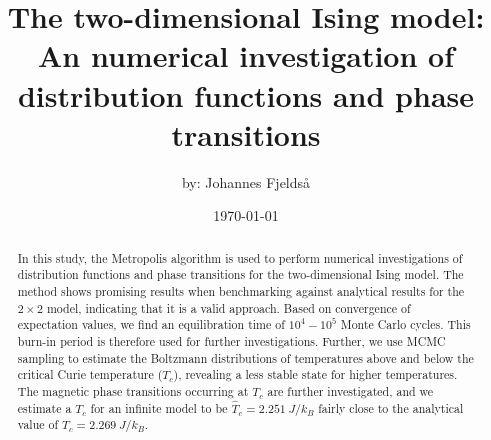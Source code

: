 \documentclass[english,notitlepage,reprint,nofootinbib]{revtex4-2}  %
\begin{document}
\title{
The two-dimensional Ising model:\\
An numerical investigation of distribution functions and phase transitions
}      %
\author{by: Johannes Fjeldså}          %
\date{\today}                             %
\noaffiliation                            %

\begin{abstract}
    In this study, the Metropolis algorithm is used to perform numerical investigations of distribution functions and phase transitions for the two-dimensional Ising model. The method shows promising results when benchmarking against analytical results for the $2\times 2$ model, indicating that it is a valid approach. Based on convergence of expectation values, we find an equilibration time of $10^{4}-10^{5}$ Monte Carlo cycles. This burn-in period is therefore used for further investigations. Further, we use MCMC sampling to estimate the Boltzmann distributions of temperatures above and below the critical Curie temperature ($T_c$), revealing a less stable state for higher temperatures. The magnetic phase transitions occurring at $T_c$ are further investigated, and we estimate a $T_c$ for an infinite model to be $\hat{T}_c=2.251~J/k_B$ fairly close to the analytical value of $T_c=2.269~J/k_B$.
\end{abstract}
\maketitle























\newpage
\onecolumngrid
% 



\newpage

\end{document}
